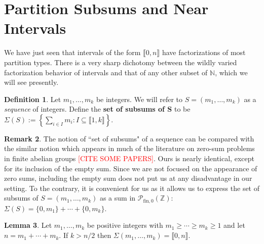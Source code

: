 \documentclass{report}
\newcommand{\NN}{\mathbb{N}}
\renewcommand{\P}{\mathcal{P}}
\newcommand{\ZZ}{\mathbb{Z}}
\newcommand{\llb}{\llbracket}
\newcommand{\rrb}{\rrbracket}
\newcommand{\fon}{{\textrm{fin}, 0}}
\renewcommand{\:}{\text{:}}
\theoremstyle{definition}
\newtheorem{defn}{Definition}[section]
\newtheorem{lemma}[defn]{Lemma}
\newtheorem{rk}[defn]{Remark}
\begin{document}
\section{Partition Subsums and Near Intervals}
We have just seen that intervals of the form $\llb 0,n \rrb$ have factorizations of most partition types.
There is a very sharp dichotomy between the wildly varied factorization behavior of intervals and that of any other subset of $\NN$, which we will see presently.  

\begin{defn}
	Let $m_1,\dots, m_k$ be integers.
	We will refer to $S = (m_1,\dots, m_k)$ as a \textit{sequence} of integers.
	Define the \textbf{set of subsums of S} to be $\Sigma(S) := \left\{ \sum_{i\in I} m_i : I\subseteq \llb 1,k \rrb \right\}$.
\end{defn}

\begin{rk}
	The notion of ``set of subsums" of a sequence can be compared with the similar notion which appears in much of the literature on zero-sum problems in finite abelian groups \textcolor{red}{[CITE SOME PAPERS]}.  
	Ours is nearly identical, except for its inclusion of the empty sum.
	Since we are not focused on the appearance of zero sums, including the empty sum does not put us at any disadvantage in our setting.
	To the contrary, it is convenient for us as it allows us to express the set of subsums of $S = (m_1,\dots, m_k)$ as a sum in $\P_\fon(\ZZ)$: $\Sigma(S)  = \{0,m_1\} + \cdots +\{0,m_k\}$.
\end{rk}

\begin{lemma} \label{lem:long-partitions}
	Let $m_1,\dots, m_k$ be positive integers with $m_1\ge \cdots \ge m_k \ge 1$ and let $n = m_1 + \cdots + m_k$.
	If $k> n/2$ then $\Sigma(m_1,\dots, m_k) = \llb 0,n \rrb$.
\end{lemma}
\end{document}
